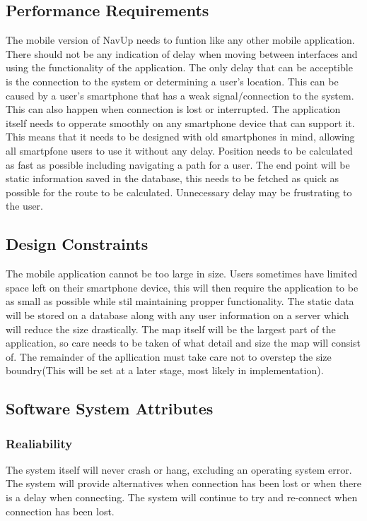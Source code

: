 \documentclass{article}
\begin{document}
	\subsection{Performance Requirements}
The mobile version of NavUp needs to funtion like any other mobile application. There should not be any indication of delay when moving between interfaces and using the functionality of the application. The only delay that can be acceptible is the connection to the system or determining a user's location. This can be caused by a user's smartphone that has a weak signal/connection to the system. This can also happen when connection is lost or interrupted. The application itself needs to opperate smoothly on any smartphone device that can support it. This means that it needs to be designed with old smartphones in mind, allowing all smartpfone users to use it without any delay. Position needs to be calculated as fast as possible including navigating a path for a user. The end point will be static information saved in the database, this needs to be fetched as quick as possible for the route to be calculated. Unnecessary delay may be frustrating to the user.	
	\subsection{Design Constraints}
The mobile application cannot be too large in size. Users sometimes have limited space left on their smartphone device, this will then require the application to be as small as possible while stil maintaining propper functionality. The static data will be stored on a database along with any user information on a server which will reduce the size drastically. The map itself will be the largest part of the application, so care needs to be taken of what detail and size the map will consist of. The remainder of the apllication must take care not to overstep the size boundry(This will be set at a later stage, most likely in implementation). 
	\subsection{Software System Attributes}
		\subsubsection{Realiability}
		The system itself will never crash or hang, excluding an operating system error. The system will provide alternatives when connection has been lost or when there is a delay when connecting. The system will continue to try and re-connect when connection has been lost.
\end{document}
